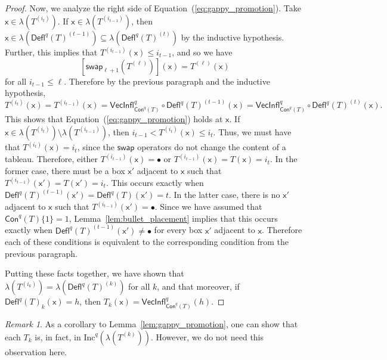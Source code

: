 \documentclass[12pt]{amsart}
\newcommand{\x}{\ensuremath{\mathsf{x}}}
\theoremstyle{definition}
\theoremstyle{remark}
\newtheorem{remark}[theorem]{Remark}
\numberwithin{equation}{section}
\newcommand{\inc}{\ensuremath{\mathrm{Inc}}}
\newcommand{\swap}{\ensuremath{\mathsf{swap}}}
\newcommand{\deflate}{\ensuremath{\mathsf{Defl}}}
\newcommand{\inflate}{\ensuremath{\mathsf{VecInfl}}}
\newcommand{\content}{\ensuremath{\mathsf{Con}}}
\begin{document}
\begin{proof}
Now, we analyze the right side of Equation~(\ref{eq:gappy_promotion}). Take $\x \in \lambda\left( T^{(i_t)} \right)$.   If $\x \in \lambda \left(T^{(i_{t-1})} \right)$, then $\x \in \lambda(\deflate^q(T)^{(t-1)}) \subseteq \lambda(\deflate^q(T)^{(t)})$ by the inductive hypothesis. Further, this implies that $T^{(i_{t-1})}(\x) \leq i_{t-1}$,  and so we have
\[
\left[ \swap_{\ell+1} \left(T^{(\ell)} \right) \right](\x) = T^{(\ell)}(\x)
\]
 for all $i_{t-1} \leq \ell$. Therefore by the previous paragraph and the inductive hypothesis,
 \[ T^{(i_t)}(\x) = T^{(i_{t-1})}(\x) = \inflate^q_{\content^q(T)} \circ \deflate^q(T)^{(t-1)}(\x) =  \inflate^q_{\content^q(T)} \circ \deflate^q(T)^{(t)}(\x). \] This shows that Equation~(\ref{eq:gappy_promotion}) holds at $\x$. If $\x \in \lambda \left(T^{(i_{t})} \right) \setminus \lambda \left(T^{(i_{t-1})} \right)$, then $i_{t-1} < T^{(i_{t})}(\x) \leq i_t$. Thus, we must have that $T^{(i_{t})}(\x) = i_{t}$, since the $\swap$ operators do not change the content of a tableau. Therefore, either $T^{(i_{t-1})}(\x) = \bullet$ or $T^{(i_{t-1})}(\x) =  T(\x) = i_{t}$. In the former case, there must be a box $\x'$ adjacent to $\x$ such that $T^{(i_{t-1})}(\x') = T(\x') = i_{t}$. This occurs exactly when $\deflate^q(T)^{(t-1)}(\x') = \deflate^q(T)(\x') = t$. In the latter case, there is no $\x'$ adjacent to $\x$ such that $T^{(i_{t-1})}(\x') = \bullet$. Since we have assumed that  $\content^q(T) \lbrace 1 \rbrace = 1$, Lemma~\ref{lem:bullet_placement} implies that this occurs exactly when  $\deflate^q(T)^{(t-1)}(\x') \neq \bullet$ for every box $\x'$ adjacent to $\x$. Therefore each of these conditions is equivalent to the corresponding condition from the previous paragraph. 
 
Putting these facts together, we have shown that $\lambda \left(T^{(i_k)} \right) = \lambda \left(\deflate^q(T)^{(k)} \right)$ for all $k$, and that moreover, if $\deflate^q(T)_{k}(\x) = h$, then $T_k(\x) = \inflate^q_{\content^q(T)}(h)$. 
\end{proof}

\begin{remark}
As a corollary to Lemma~\ref{lem:gappy_promotion}, one can show that each $T_k$ is, in fact, in $\inc^q \left(\lambda \left( T^{(k)} \right) \right)$. However, we do not need this observation here.
\end{remark}
\end{document}
